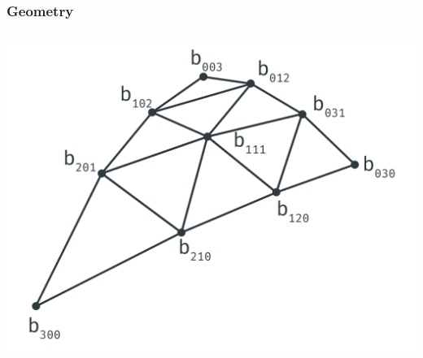 	\begin{frame}\frametitle{Geometry}
		\begin{columns}
			\begin{column}{0.6\textwidth}
				\begin{center}
				\includegraphics[width=\textwidth]{img/1_single/geometry_4.png}
				\end{center}	
			\end{column}
		\end{columns}
	\end{frame}

